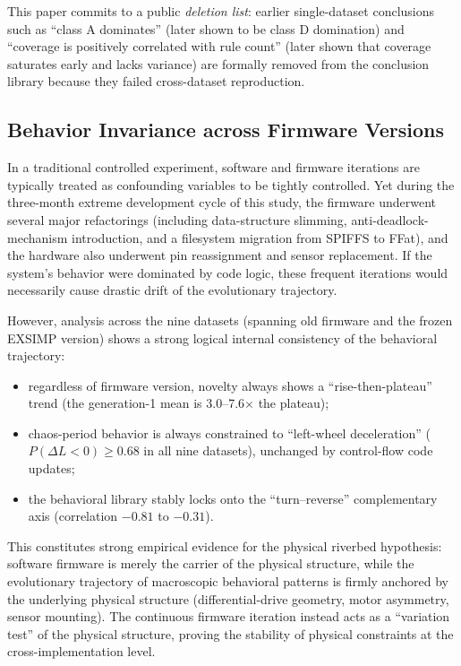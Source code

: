 \documentclass[11pt]{article}
\begin{document}
This paper commits to a public \emph{deletion list}: earlier single-dataset conclusions such as ``class A dominates'' (later shown to be class D domination) and ``coverage is positively correlated with rule count'' (later shown that coverage saturates early and lacks variance) are formally removed from the conclusion library because they failed cross-dataset reproduction.

\subsection{Behavior Invariance across Firmware Versions}
In a traditional controlled experiment, software and firmware iterations are typically treated as confounding variables to be tightly controlled. Yet during the three-month extreme development cycle of this study, the firmware underwent several major refactorings (including data-structure slimming, anti-deadlock-mechanism introduction, and a filesystem migration from SPIFFS to FFat), and the hardware also underwent pin reassignment and sensor replacement. If the system's behavior were dominated by code logic, these frequent iterations would necessarily cause drastic drift of the evolutionary trajectory.

However, analysis across the nine datasets (spanning old firmware and the frozen EXSIMP version) shows a strong logical internal consistency of the behavioral trajectory:
\begin{itemize}
  \item regardless of firmware version, novelty always shows a ``rise-then-plateau'' trend (the generation-1 mean is 3.0--7.6$\times$ the plateau);
  \item chaos-period behavior is always constrained to ``left-wheel deceleration'' ($P(\Delta L < 0) \ge 0.68$ in all nine datasets), unchanged by control-flow code updates;
  \item the behavioral library stably locks onto the ``turn--reverse'' complementary axis (correlation $-0.81$ to $-0.31$).
\end{itemize}

This constitutes strong empirical evidence for the physical riverbed hypothesis: software firmware is merely the carrier of the physical structure, while the evolutionary trajectory of macroscopic behavioral patterns is firmly anchored by the underlying physical structure (differential-drive geometry, motor asymmetry, sensor mounting). The continuous firmware iteration instead acts as a ``variation test'' of the physical structure, proving the stability of physical constraints at the cross-implementation level.
\end{document}
